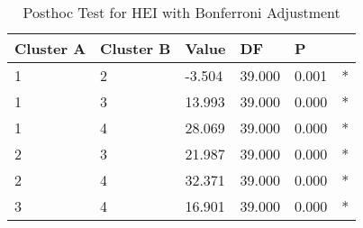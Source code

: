 \begin{table}[h]
\caption{Posthoc Test for HEI with Bonferroni Adjustment}
\label{tab:posthoc_HEI}
\begin{tabular}{llllll}
\toprule
Cluster A & Cluster B & Value & DF & P &   \\
\midrule
1 & 2 & -3.504 & 39.000 & 0.001 & * \\
1 & 3 & 13.993 & 39.000 & 0.000 & * \\
1 & 4 & 28.069 & 39.000 & 0.000 & * \\
2 & 3 & 21.987 & 39.000 & 0.000 & * \\
2 & 4 & 32.371 & 39.000 & 0.000 & * \\
3 & 4 & 16.901 & 39.000 & 0.000 & * \\
\bottomrule
\end{tabular}
\end{table}
